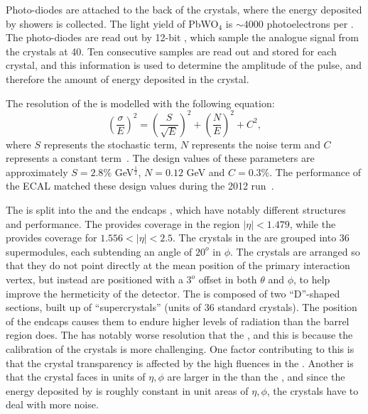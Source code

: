 Photo-diodes are attached to the back of the crystals, where the energy deposited by showers is collected. The light yield of PbWO$_4$ is $\sim 4000 $ photoelectrons per \GeV. The photo-diodes are read out by 12-bit \ADC, which sample the analogue signal from the crystals at 40\MHz. Ten consecutive samples are read out and stored for each crystal, and this information is used to determine the amplitude of the pulse, and therefore the amount of energy deposited in the crystal.

The resolution of the \ECAL is modelled with the following equation:
\begin{equation} 
\left( \frac{\sigma}{E}\right) ^2= \left( \frac{S}{\sqrt{E}} \right)^2 + \left( \frac{N}{E} \right)^2 + C^2,
\end{equation}
where $S$ represents the stochastic term, $N$ represents the noise term and $C$ represents a constant term~\cite{CMSTDR}. The design values of these parameters are approximately $S=2.8\%$ GeV$^\frac{1}{2}$, $ N= 0.12$ GeV and $C=0.3 \%$. The performance of the ECAL matched these design values during the 2012 run~\cite{ECAL2012}. 



The \ECAL is split into the \EB and the endcaps \EE, which have notably different structures and performance. The \EB provides coverage in the region $|\eta| < 1.479$, while the \EE provides coverage for $1.556 < |\eta| < 2.5$. The crystals in the \EB are grouped into 36 supermodules, each subtending an angle of $20^o$ in $\phi$. The crystals are arranged so that they do not point directly at the mean position of the primary interaction vertex, but instead are positioned with a $3^o$ offset in both $\theta$ and $\phi$, to help improve the hermeticity of the detector. The \EE is composed of two ``D''-shaped sections, built up of ``supercrystals'' (units of 36 standard crystals). The position of the endcaps causes them to endure higher levels of radiation than the barrel region does. The \EE has notably worse resolution that the \EB, and this is because the calibration of the crystals is more challenging. One factor contributing to this is that the crystal transparency is affected by the high fluences in the \EE. Another is that the crystal faces in units of $\eta,\phi$ are larger in the \EE than the \EB, and since the energy deposited by \PU is roughly constant in unit areas of $\eta,\phi$, the \EE crystals have to deal with more noise.

